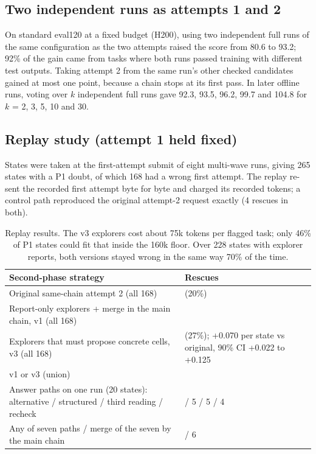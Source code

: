 \subsection{Two independent runs as attempts 1 and 2}
On standard eval120 at a fixed budget (H200), using two independent full runs of the same configuration as the two attempts raised the score from 80.6 to 93.2; 92\% of the gain came from tasks where both runs passed training with different test outputs. Taking attempt 2 from the same run's other checked candidates gained at most one point, because a chain stops at its first pass. In later offline runs, voting over $k$ independent full runs gave 92.3, 93.5, 96.2, 99.7 and 104.8 for $k$ = 2, 3, 5, 10 and 30.

\subsection{Replay study (attempt 1 held fixed)}
States were taken at the first-attempt submit of eight multi-wave runs, giving 265 states with a P1 doubt, of which 168 had a wrong first attempt. The replay re-sent the recorded first attempt byte for byte and charged its recorded tokens; a control path reproduced the original attempt-2 request exactly (4 rescues in both).

\begin{table}[H]\centering\small
\begin{tabularx}{\linewidth}{@{}>{\raggedright\arraybackslash}X>{\raggedright\arraybackslash}X@{}}
\toprule
Second-phase strategy & Rescues \\
\midrule
Original same-chain attempt 2 (all 168) & 34 (20\%) \\
Report-only explorers + merge in the main chain, v1 (all 168) & 42 \\
Explorers that must propose concrete cells, v3 (all 168) & 46 (27\%); +0.070 per state vs original, 90\% CI +0.022 to +0.125 \\
v1 or v3 (union) & 54 \\
Answer paths on one run (20 states): alternative / structured / third reading / recheck & 4 / 5 / 5 / 4 \\
Any of seven paths / merge of the seven by the main chain & 6 / 6 \\
\bottomrule
\end{tabularx}
\caption{Replay results. The v3 explorers cost about 75k tokens per flagged task; only 46\% of P1 states could fit that inside the 160k floor. Over 228 states with explorer reports, both versions stayed wrong in the same way 70\% of the time.}
\end{table}

